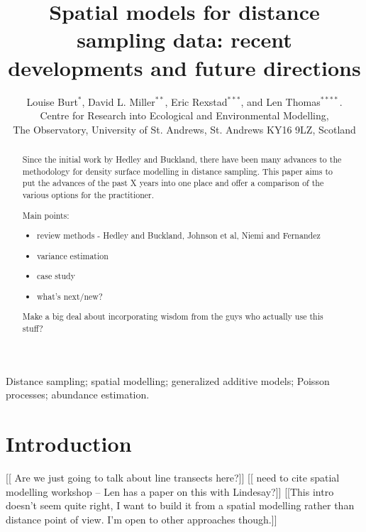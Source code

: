 \documentclass[useAMS,referee]{biom}
\title[Spatial models for distance sampling]{Spatial models for distance sampling data: recent developments and future directions}
\author{
Louise Burt$^{*}$\email{louise@mcs.st-andrews.ac.uk},
David L. Miller$^{**}$\email{dave@ninepointeightone.net}, 
Eric Rexstad$^{***}$\email{ericr@mcs.st-andrews.ac.uk}, and 
Len Thomas$^{****}$\email{len@mcs.st-andrews.ac.uk}.
\\
Centre for Research into Ecological and Environmental Modelling,\\ The Observatory, University of St. Andrews, St. Andrews KY16 9LZ, Scotland}
\begin{document}
\pagerange{\pageref{firstpage}--\pageref{lastpage}} 
\label{firstpage}


\begin{abstract}
Since the initial work by Hedley and Buckland, there have been many advances to the methodology for density surface modelling in distance sampling. This paper aims to put the advances of the past X years into one place and offer a comparison of the various options for the practitioner.

Main points:
\begin{itemize}
\item review methods - Hedley and Buckland, Johnson et al, Niemi and Fernandez
\item variance estimation
\item case study 
\item what's next/new?
\end{itemize}

Make a big deal about incorporating wisdom from the guys who actually use this stuff?
\end{abstract}

%

\begin{keywords}
Distance sampling; spatial modelling; generalized additive models; Poisson processes; abundance estimation.
\end{keywords}


\maketitle

\section{Introduction}
\label{s:intro}

[[ Are we just going to talk about line transects here?]]
[[ need to cite spatial modelling workshop -- Len has a paper on this with Lindesay?]]
[[This intro doesn't seem quite right, I want to build it from a spatial modelling rather than distance point of view. I'm open to other approaches though.]]
\end{document}

